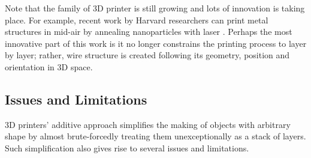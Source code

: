 %


Note that the family of 3D printer is still growing and lots of innovation is taking place. For example, recent work by Harvard researchers can print metal structures in mid-air by annealing nanoparticles with laser \cite{skylar2016laser}. Perhaps the most innovative part of this work is it no longer constrains the printing process to layer by layer; rather, wire structure is created following its geometry, position and orientation in 3D space.

\subsection{Issues and Limitations}
3D printers' additive approach simplifies the making of objects with arbitrary shape by almost brute-forcedly treating them unexceptionally as a stack of layers. Such simplification also gives rise to several issues and limitations.

